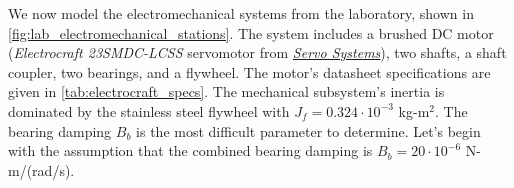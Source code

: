 \documentclass[dynamic_systems.tex]{subfiles}
\begin{document}
We now model the electromechanical systems from the laboratory, shown in \autoref{fig:lab_electromechanical_stations}.
The system includes a brushed DC motor (\emph{Electrocraft 23SMDC-LCSS} servomotor from \href{http://servosystems.com/electrocraft_dcbrush_rdm103.html}{\emph{Servo Systems}}), two shafts, a shaft coupler, two bearings, and a flywheel.
The motor's datasheet specifications are given in \autoref{tab:electrocraft_specs}.
The mechanical subsystem's inertia is dominated by the stainless steel flywheel with $J_f = 0.324\cdot10^{-3}$ kg-m$^2$.
The bearing damping $B_b$ is the most difficult parameter to determine.
Let's begin with the assumption that the combined bearing damping is $B_b = 20\cdot10^{-6}$ N-m/(rad/s).
\tags{}

\endgroup

\end{document}
